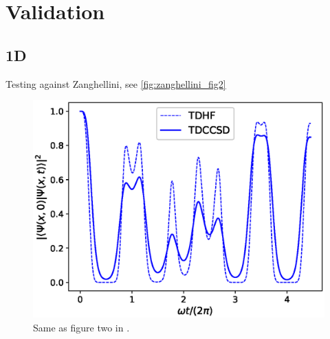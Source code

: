 \chapter{Validation}

\section{1D}

Testing against Zanghellini\cite{Zanghellini04}, see \autoref{fig:zanghellini_fig2}

\begin{figure}
    \centering
   \includegraphics[width=\textwidth]{results/figures/zanghellini_fig2.eps}
    \caption{
        \label{fig:zanghellini_fig2}
        Same as figure two in \cite{Zanghellini04}.
    }
\end{figure}